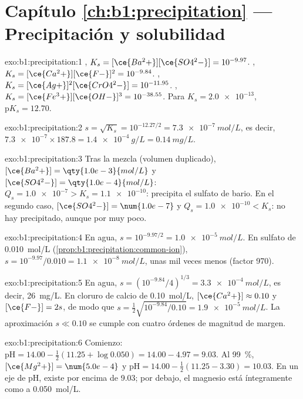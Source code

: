 \section*{Capítulo \ref{ch:b1:precipitation} --- Precipitación y solubilidad}

\begin{solution}{exo:b1:precipitation:1}
, $K_s = [\ce{Ba^2+}][\ce{SO4^2-}] =
10^{-9.97}$. , $K_s = [\ce{Ca^2+}][\ce{F-}]^2 =
10^{-9.84}$. , $K_s =
[\ce{Ag+}]^2[\ce{CrO4^2-}] = 10^{-11.95}$. ,
$K_s = [\ce{Fe^3+}][\ce{OH-}]^3 = 10^{-38.55}$. Para $K_s = \num{2.0e-13}$,
$\mathrm{p}K_s = 12.70$.
\end{solution}

\begin{solution}{exo:b1:precipitation:2}
$s = \sqrt{K_s} = 10^{-12.27/2} = \qty{7.3e-7}{mol/L}$, es decir,
$\num{7.3e-7} \times 187.8 = \qty{1.4e-4}{g/L} = \qty{0.14}{mg/L}$.
\end{solution}

\begin{solution}{exo:b1:precipitation:3}
Tras la mezcla (volumen duplicado), $[\ce{Ba^2+}] = \qty{1.0e-3}{mol/L}$ y
$[\ce{SO4^2-}] = \qty{1.0e-4}{mol/L}$: $Q_s = \num{1.0e-7} > K_s =
\num{1.1e-10}$: precipita el sulfato de bario. En el segundo caso,
$[\ce{SO4^2-}] = \num{1.0e-7}$ y $Q_s = \num{1.0e-10} < K_s$: no hay
precipitado, aunque por muy poco.
\end{solution}

\begin{solution}{exo:b1:precipitation:4}
En agua, $s = 10^{-9.97/2} = \qty{1.0e-5}{mol/L}$. En sulfato de
\qty{0.010}{mol/L} (\cref{prop:b1:precipitation:common-ion}),
$s = 10^{-9.97}/0.010 =
\qty{1.1e-8}{mol/L}$, unas mil veces menos (factor 970).
\end{solution}

\begin{solution}{exo:b1:precipitation:5}
En agua, $s = (10^{-9.84}/4)^{1/3} = \qty{3.3e-4}{mol/L}$, es decir,
\qty{26}{mg/L}. En cloruro de calcio de \qty{0.10}{mol/L},
$[\ce{Ca^2+}] \approx 0.10$ y $[\ce{F-}] = 2s$, de modo que
$s = \frac12\sqrt{10^{-9.84}/0.10} = \qty{1.9e-5}{mol/L}$. La
aproximación $s \ll 0.10$ se cumple con cuatro órdenes de magnitud de
margen.
\end{solution}

\begin{solution}{exo:b1:precipitation:6}
Comienzo: $\mathrm{pH} = 14.00 - \frac12(11.25 + \log 0.050) = 14.00 - 4.97 =
9.03$. Al \qty{99}{\percent}, $[\ce{Mg^2+}] = \num{5.0e-4}$ y
$\mathrm{pH} = 14.00 - \frac12(11.25 - 3.30) = 10.03$. En un eje de pH,
 existe por encima de 9.03; por debajo, el magnesio está
íntegramente como  a \qty{0.050}{mol/L}.
\end{solution}

